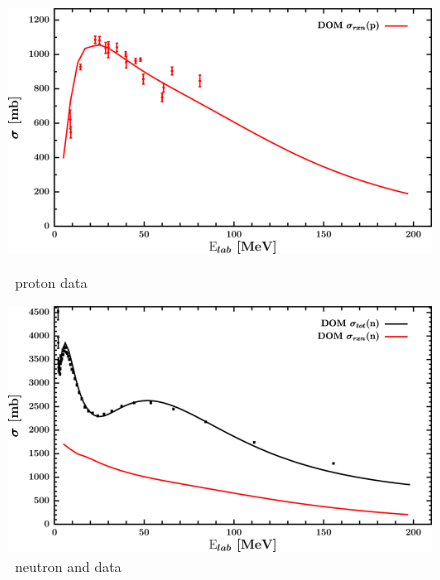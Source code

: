 \begin{figure}[H]
    \centering
    \begin{minipage}{0.45\textwidth}
        \centering
        \includegraphics[width=1.0\textwidth]{figures/ni58_protonInelastic.png}
        \caption{\niEight\ proton \rxn data}
        \label{DOMFitData_ni58_proton_inelastic}
    \end{minipage}\hfill
    \begin{minipage}{0.45\textwidth}
        \centering
        \includegraphics[width=1.0\textwidth]{figures/ni58_neutronInelastic.png}
        \caption{\niEight\ neutron \rxn and \tot data}
        \label{DOMFitData_ni58_neutron_inelastic}
    \end{minipage}
\end{figure}

\afterpage{\clearpage}

